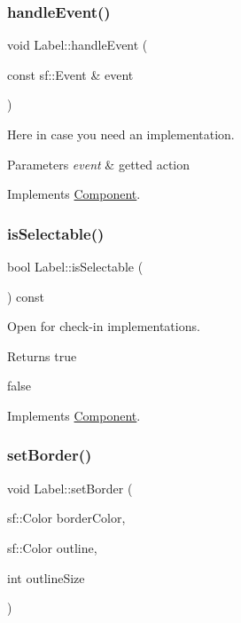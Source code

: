 \subsubsection{\texorpdfstring{handle\+Event()}{handleEvent()}}
{\footnotesize\ttfamily void Label\+::handle\+Event (\begin{DoxyParamCaption}\item[{const sf\+::\+Event \&}]{event }\end{DoxyParamCaption})\hspace{0.3cm}{\ttfamily [virtual]}}



Here in case you need an implementation. 


\begin{DoxyParams}{Parameters}
{\em event} & getted action \\
\hline
\end{DoxyParams}


Implements \hyperlink{classComponent}{Component}.

\mbox{\label{classLabel_ac27e6e31942be4612d282af282b65051}} 
\subsubsection{\texorpdfstring{is\+Selectable()}{isSelectable()}}
{\footnotesize\ttfamily bool Label\+::is\+Selectable (\begin{DoxyParamCaption}{ }\end{DoxyParamCaption}) const\hspace{0.3cm}{\ttfamily [virtual]}}



Open for check-\/in implementations. 

\begin{DoxyReturn}{Returns}
true 

false 
\end{DoxyReturn}


Implements \hyperlink{classComponent_aede74a18a443413465216f383a046028}{Component}.

\mbox{\label{classLabel_ab881215fca0b1450c7c725c333c86220}} 
\subsubsection{\texorpdfstring{set\+Border()}{setBorder()}}
{\footnotesize\ttfamily void Label\+::set\+Border (\begin{DoxyParamCaption}\item[{sf\+::\+Color}]{border\+Color,  }\item[{sf\+::\+Color}]{outline,  }\item[{int}]{outline\+Size }\end{DoxyParamCaption})}



